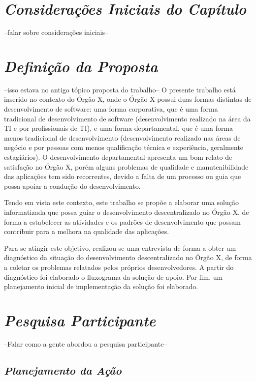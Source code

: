 \section{\textit{Considerações Iniciais do Capítulo}}

--falar sobre considerações iniciais--

\section{\textit{Definição da Proposta}}

--isso estava no antigo tópico proposta do trabalho--
O presente trabalho está inserido no contexto do Órgão X, onde o Órgão X possui duas formas distintas de desenvolvimento de software: uma forma corporativa, que é uma forma tradicional de desenvolvimento de software (desenvolvimento realizado na área da TI e por profissionais de TI), e uma forma departamental, que é uma forma menos tradicional de desenvolvimento (desenvolvimento realizado nas áreas de negócio e por pessoas com menos qualificação técnica e experiência, geralmente estagiários).
O desenvolvimento departamental apresenta um bom relato de satisfação no Órgão X, porém alguns problemas de qualidade e manutenibilidade das aplicações tem sido recorrentes, devido a falta de um processo ou guia que possa apoiar a condução do desenvolvimento.

Tendo em vista este contexto, este trabalho se propõe a elaborar uma solução informatizada que possa guiar o desenvolvimento descentralizado no Órgão X, de forma a estabelecer as atividades e os padrões de desenvolvimento que possam contribuir para a melhora na qualidade das aplicações.

Para se atingir este objetivo, realizou-se uma entrevista de forma a obter um diagnóstico da situação do desenvolvimento descentralizado no Órgão X, de forma a coletar os problemas relatados pelos próprios desenvolvedores. A partir do diagnóstico foi elaborado o fluxograma da solução de apoio. Por fim, um planejamento inicial de implementação da solução foi elaborado.

\section{\textit{Pesquisa Participante}}

--Falar como a gente abordou a pesquisa participante--

\subsection{\textit{Planejamento da Ação}}

